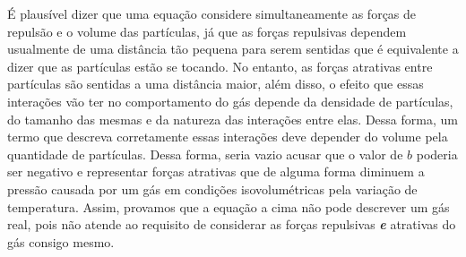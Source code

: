\begin{rsl}
    É plausível dizer que uma equação considere simultaneamente as forças de repulsão
    e o volume das partículas, já que as forças repulsivas dependem usualmente de uma
    distância tão pequena para serem sentidas que é equivalente a dizer que as partículas
    estão se tocando. No entanto, as forças atrativas entre partículas são sentidas a uma
    distância maior, além disso, o efeito que essas interações vão ter no comportamento do 
    gás depende da densidade de partículas, do tamanho das mesmas e da natureza das interações
    entre elas. Dessa forma, um termo que descreva corretamente essas interações deve depender
    do volume pela quantidade de partículas. Dessa forma, seria vazio acusar que o valor de $b$
    poderia ser negativo e representar forças atrativas que de alguma forma diminuem a pressão
    causada por um gás em condições isovolumétricas pela variação de temperatura. Assim, 
    provamos que a equação a cima não pode descrever um gás real, pois não atende ao requisito
    de considerar as forças repulsivas \textit{\textbf{e}} atrativas do gás consigo mesmo.   
\end{rsl}
